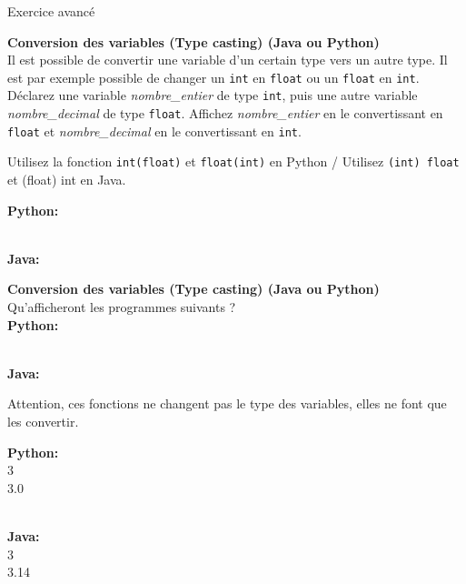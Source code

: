 Exercice avancé 
\begin{Exercice}[5 minutes] \textbf{Conversion des variables (Type casting) (Java ou Python)}\\
   Il est possible de convertir une variable d'un certain type vers un autre type. Il est par exemple possible de changer un \lstinline{int} en \lstinline{float} ou un \lstinline{float} en \lstinline{int}. Déclarez une variable \textit{nombre\_entier} de type \lstinline{int}, puis une autre variable \textit{nombre\_decimal} de type \lstinline{float}. Affichez \textit{nombre\_entier} en le convertissant en \lstinline{float} et \textit{nombre\_decimal} en le convertissant en \lstinline{int}. \\
   
    \begin{conseil}
       Utilisez la fonction \lstinline{int(float)} et \lstinline{float(int)} en Python / Utilisez \lstinline{(int) float} et (float) int en Java.
        
    \end{conseil}
    \begin{solution}
    
    \textbf{Python:}
    
    
    
    \textbf{\\Java:}
    
           
    \end{solution}   
\end{Exercice}

\begin{Exercice}[5 minutes] \textbf{Conversion des variables (Type casting) (Java ou Python) \optionnel}\\
   Qu'afficheront les programmes suivants ? \\
   
   \textbf{Python:}
   
   
   \textbf{\\Java:}
   
    
   
    \begin{conseil}
      	Attention, ces fonctions ne changent pas le type des variables, elles ne font que les convertir.
        
    \end{conseil}
    \begin{solution}
     
    \textbf{Python:}\\
    3\\
    3.0
    
    \textbf{\\Java:}\\
    3\\
    3.14 \\
           
    \end{solution}   
\end{Exercice}

